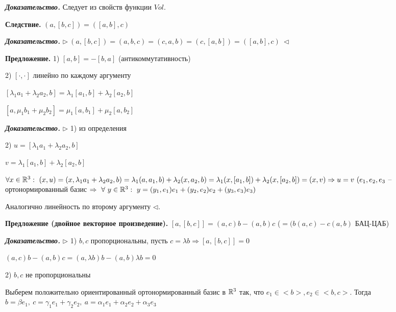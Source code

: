 \vspace{\baselineskip}
\textit{\textbf{Доказательство.}} Следует из свойств функции $Vol$.

\vspace{\baselineskip}
\textbf{Следствие.} $(a, [b, c]) = ([a, b], c)$

\vspace{\baselineskip}
\textbf{\textit{Доказательство.}} $\rhd \ (a, [b, c]) = (a, b, c) = (c, a, b) = (c, [a, b]) = ([a, b], c) \ \lhd$

\vspace{\baselineskip}
\textbf{Предложение.} 1) $[a, b] = -[b, a]$ (антикоммутативность)

2) $[\cdot, \cdot]$ линейно по каждому аргументу

$[\lambda_1 a_1 + \lambda_2 a_2, b] = \lambda_1 [a_1, b] + \lambda_2 [a_2, b]$

$[a, \mu_1 b_1 + \mu_2 b_2] = \mu_1 [a, b_1] + \mu_2 [a, b_2]$

\vspace{\baselineskip}
\textbf{\textit{Доказательство.}} $\rhd$ 1) из определения

2) $u = [\lambda_1 a_1 + \lambda_2 a_2, b]$

$v = \lambda_1 [a_1, b] + \lambda_2 [a_2, b]$

$\forall x \in \mathbb{R}^3 : \ (x, u) = (x, \lambda_1 a_1 + \lambda_2 a_2, b) = \lambda_1 (a, a_1, b) + \lambda_2 (x, a_2, b) = \lambda_1 (x, [a_1, b]) + \lambda_2 (x, [a_2, b]) = (x, v) \Rightarrow u = v \ (e_1, e_2, e_3$ -- ортонормированный базис $\Rightarrow \ \forall \ y \in \mathbb{R}^3 : \ y = (y_1, e_1) e_1 + (y_2, e_2) e_2 + (y_3, e_3) e_3)$

Аналогично линейность по второму аргументу $\lhd$.

\vspace{\baselineskip}
\textbf{Предложение (двойное векторное произведение).} $[a, [b, c]] = (a, c) b - (a, b) c$ ($= (b (a, c) - c (a, b)$ БАЦ-ЦАБ)

\vspace{\baselineskip}
\textbf{\textit{Доказательство.}} $\rhd$ 1) $b, c$ пропорциональны, пусть $c = \lambda b \Rightarrow [a, [b, c]] = 0$

$(a, c)b - (a, b) c = (a, \lambda b)b - (a, b) \lambda b = 0$

2) $b, c$ не пропорциональны

Выберем положительно ориентированный ортонормированный базис в $\mathbb{R}^3$ так, что $e_1 \in <b>, e_2 \in <b, c>$. Тогда $b = \beta e_1, \ c = \gamma_1 e_1 + \gamma_2 e_2, \ a = \alpha_1 e_1 + \alpha_2 e_2 + \alpha_3 e_3$

